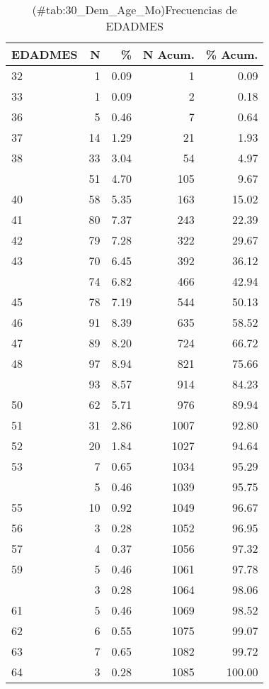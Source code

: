 \documentclass[
]{article}
\begin{document}
\begin{table}

\caption{(\#tab:30_Dem_Age_Mo)Frecuencias de EDADMES}
\centering
\begin{tabular}[t]{lrrrr}
\toprule
EDADMES & N & \% & N Acum. & \% Acum.\\
\midrule
32 & 1 & 0.09 & 1 & 0.09\\
33 & 1 & 0.09 & 2 & 0.18\\
36 & 5 & 0.46 & 7 & 0.64\\
37 & 14 & 1.29 & 21 & 1.93\\
38 & 33 & 3.04 & 54 & 4.97\\
\addlinespace
39 & 51 & 4.70 & 105 & 9.67\\
40 & 58 & 5.35 & 163 & 15.02\\
41 & 80 & 7.37 & 243 & 22.39\\
42 & 79 & 7.28 & 322 & 29.67\\
43 & 70 & 6.45 & 392 & 36.12\\
\addlinespace
44 & 74 & 6.82 & 466 & 42.94\\
45 & 78 & 7.19 & 544 & 50.13\\
46 & 91 & 8.39 & 635 & 58.52\\
47 & 89 & 8.20 & 724 & 66.72\\
48 & 97 & 8.94 & 821 & 75.66\\
\addlinespace
49 & 93 & 8.57 & 914 & 84.23\\
50 & 62 & 5.71 & 976 & 89.94\\
51 & 31 & 2.86 & 1007 & 92.80\\
52 & 20 & 1.84 & 1027 & 94.64\\
53 & 7 & 0.65 & 1034 & 95.29\\
\addlinespace
54 & 5 & 0.46 & 1039 & 95.75\\
55 & 10 & 0.92 & 1049 & 96.67\\
56 & 3 & 0.28 & 1052 & 96.95\\
57 & 4 & 0.37 & 1056 & 97.32\\
59 & 5 & 0.46 & 1061 & 97.78\\
\addlinespace
60 & 3 & 0.28 & 1064 & 98.06\\
61 & 5 & 0.46 & 1069 & 98.52\\
62 & 6 & 0.55 & 1075 & 99.07\\
63 & 7 & 0.65 & 1082 & 99.72\\
64 & 3 & 0.28 & 1085 & 100.00\\
\bottomrule
\end{tabular}
\end{table}
\end{document}
